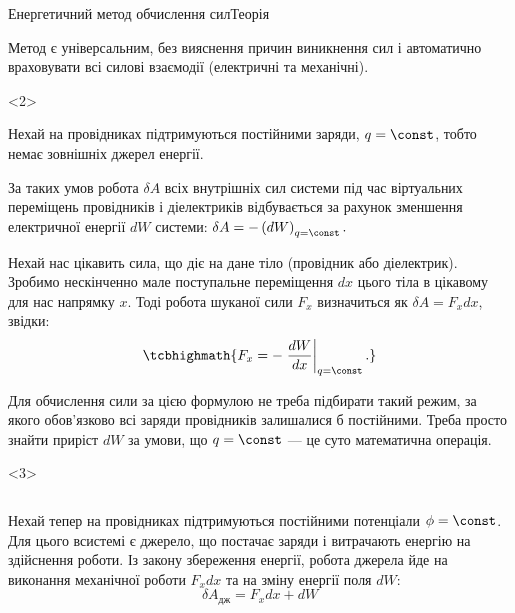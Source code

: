 \documentclass[onlytextwidth]{beamer}
\begin{document}
\begin{frame}{Енергетичний метод обчислення сил}{Теорія}
\begin{onlyenv}
\begin{block}{}
			Метод є універсальним, без вияснення причин виникнення сил і автоматично враховувати всі
			силові взаємодії (електричні та механічні).
		\end{block}
	\end{onlyenv}
	\begin{onlyenv}\small
		\begin{block}{}\justifying
			Нехай на провідниках підтримуються постійними заряди, $q = \const$, тобто немає зовнішніх
			джерел енергії.
		\end{block}
		\begin{block}{}\justifying
			За таких умов робота $\delta A$ всіх внутрішніх сил системи під час віртуальних переміщень
			провідників і діелектриків відбувається за рахунок зменшення електричної енергії $dW$ системи:
			$
				\delta A = - \left( dW\right)_{q=\const}.
			$
		\end{block}
		\begin{block}{}\scriptsize
			Нехай нас цікавить сила, що діє на дане тіло (провідник або діелектрик). Зробимо нескінченно
			мале поступальне переміщення $dx$ цього тіла в цікавому для нас напрямку $x$. Тоді робота
			шуканої сили $F_x$ визначиться як $\delta A = F_x dx$, звідки:
			\begin{equation*}
				\tcbhighmath{F_x = -\left.\frac{dW}{dx}\right|_{q=\const}.}
			\end{equation*}
		\end{block}
		\begin{alertblock}{}\scriptsize
			Для обчислення сили за цією формулою не треба підбирати такий режим, за якого обов'язково всі
			заряди провідників залишалися б постійними. Треба просто знайти приріст $dW$ за умови, що $q =
				\const$ --- це суто математична операція.
		\end{alertblock}
	\end{onlyenv}
	\begin{onlyenv}\small
		\begin{columns}
			\begin{column}{0.6\linewidth}
				\begin{block}{}\justifying
					Нехай тепер на провідниках підтримуються постійними потенціали $\phi=\const$.
					Для цього всистемі є \alert{джерело, що постачає заряди і витрачають енергію на
						здійснення роботи}. Із закону збереження енергії, робота джерела йде на
					виконання механічної роботи $F_x dx$ та на зміну енергії поля $dW$:
					\begin{equation*}
						\delta A_\text{дж} = F_x dx + dW

\end{equation*}
\end{block}
\end{column}
\end{columns}
\end{onlyenv}
\end{frame}
\end{document}
